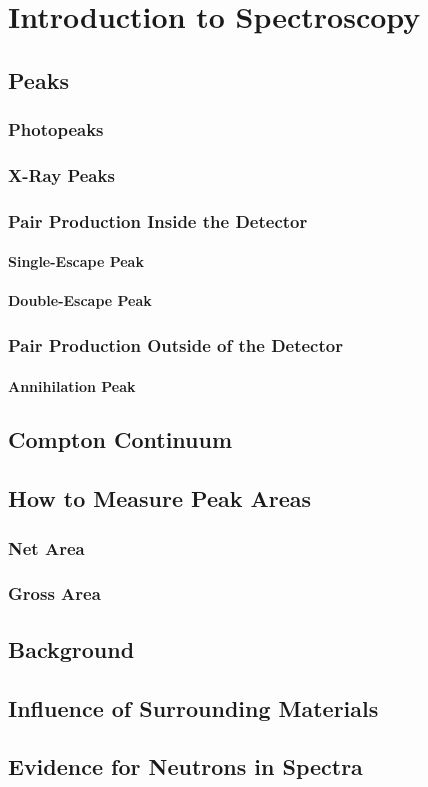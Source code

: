 \chapter{Introduction to Spectroscopy}

\section{Peaks}
\subsection{Photopeaks}
\subsection{X-Ray Peaks}
\subsection{Pair Production Inside the Detector}
\subsubsection{Single-Escape Peak}
\subsubsection{Double-Escape Peak}
\subsection{Pair Production Outside of the Detector}
\subsubsection{Annihilation Peak}

\section{Compton Continuum}

\section{How to Measure Peak Areas}
\subsection{Net Area}
\subsection{Gross Area}

\section{Background}

\section{Influence of Surrounding Materials}

\section{Evidence for Neutrons in Spectra}
